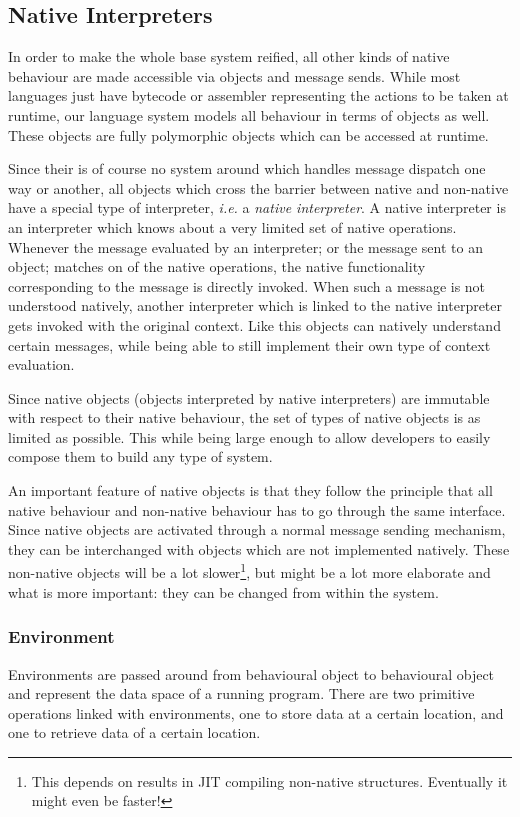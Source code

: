 \documentclass{article}
\newcommand{\ie}{\emph{i.e.}\xspace}
\begin{document}
\subsection{Native Interpreters}
In order to make the whole base system reified, all other kinds of native
behaviour are made accessible via objects and message sends. While most
languages just have bytecode or assembler representing the actions to be taken
at runtime, our language system models all behaviour in terms of objects as
well. These objects are fully polymorphic objects which can be accessed at
runtime.

Since their is of course no system around which handles message
dispatch one way or another, all objects which cross the barrier between
native and non-native have a special type of interpreter, \ie a
\emph{native interpreter}. A native interpreter is an interpreter which knows
about a very limited set of native operations. Whenever the message evaluated
by an interpreter; or the message sent to an object; matches on of the native
operations, the native functionality corresponding to the message is directly
invoked. When such a message is not understood natively, another interpreter
which is linked to the native interpreter gets invoked with the original
context. Like this objects can natively understand certain messages, while
being able to still implement their own type of context evaluation.

Since native objects (objects interpreted by native interpreters) are
immutable with respect to their native behaviour, the set of types of native
objects is as limited as possible. This while being large enough to allow
developers to easily compose them to build any type of system. 

An important feature of native objects is that they follow the principle that
all native behaviour and non-native behaviour has to go through the same
interface. Since native objects are activated through a normal message sending
mechanism, they can be interchanged with objects which are not implemented
natively. These non-native objects will be a lot slower\footnote{This depends
on results in JIT compiling non-native structures. Eventually it might even be
faster!}, but might be a lot more elaborate and what is more important: they
can be changed from within the system.

\subsubsection{Environment}
Environments are passed around from behavioural object to behavioural object
and represent the data space of a running program. There are two primitive
operations linked with environments, one to store data at a certain location,
and one to retrieve data of a certain location.
\end{document}
